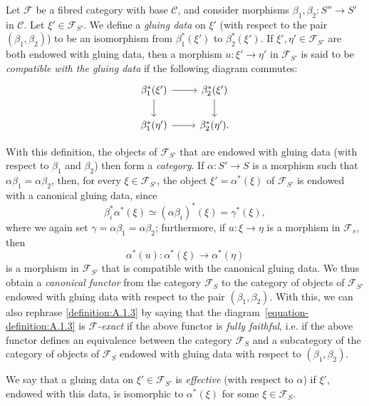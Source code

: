 \documentclass{article}
\theoremstyle{plain}
\theoremstyle{definition}
\newenvironment{definition}[1]
  {\renewcommand\theinnercustomdefinition{#1}\innercustomdefinition}
  {\endinnercustomdefinition}
\newcommand{\sh}[1]{{\mathscr{#1}}}
\newcommand{\cat}[1]{{\mathcal{#1}}}
\newcommand{\oldpage}[1]{\marginpar{\footnotesize$\Big\vert$ \textit{p.~#1}}}
\begin{document}
\begin{definition}{1.4}
  Let $\sh{F}$ be a fibred category with base $\cat{C}$, and consider morphisms $\beta_1,\beta_2\colon S''\to S'$ in $\cat{C}$.
  Let $\xi'\in\sh{F}_{S'}$.
  We define a \emph{gluing data} on $\xi'$ (with respect to the pair $(\beta_1,\beta_2)$) to be an isomorphism from $\beta_1^*(\xi')$ to $\beta_2^*(\xi')$.
  If $\xi',\eta'\in\sh{F}_{S'}$ are both endowed with gluing data, then a morphism $u\colon\xi'\to\eta'$ in $\sh{F}_{S'}$ is said to be \emph{compatible with the gluing data} if the following diagram commutes:
  \[
    \begin{tikzcd}
      \beta_1^*(\xi') \rar \dar
      &\beta_2^*(\xi') \dar
    \\\beta_1^*(\eta') \rar
      &\beta_2^*(\eta').
    \end{tikzcd}
  \]
\end{definition}

With this definition, the objects of $\sh{F}_{S'}$ that are endowed with gluing data (with respect to $\beta_1$ and $\beta_2$) then form a \emph{category}.
If $\alpha\colon S'\to S$ is a morphism such that $\alpha\beta_1=\alpha\beta_2$, then, for every $\xi\in\sh{F}_{S'}$, the object $\xi'=\alpha^*(\xi)$
\oldpage{190-04}
of $\sh{F}_{S'}$ is endowed with a canonical gluing data, since
\[
  \beta_i^*\alpha^*(\xi)
  \simeq (\alpha\beta_i)^*(\xi)
  = \gamma^*(\xi),
\]
where we again set $\gamma=\alpha\beta_1=\alpha\beta_2$;
furthermore, if $u\colon\xi\to\eta$ is a morphism in $\sh{F}_s$, then
\[
  \alpha^*(u)\colon \alpha^*(\xi) \to \alpha^*(\eta)
\]
is a morphism in $\sh{F}_{S'}$ that is compatible with the canonical gluing data.
We thus obtain a \emph{canonical functor} from the category $\sh{F}_S$ to the category of objects of $\sh{F}_{S'}$ endowed with gluing data with respect to the pair $(\beta_1,\beta_2)$.
With this, we can also rephrase \cref{definition:A.1.3} by saying that the diagram~\cref{equation-definition:A.1.3} is \emph{$\sh{F}$-exact} if the above functor is \emph{fully faithful}, i.e. if the above functor defines an equivalence between the category $\sh{F}_S$ and a subcategory of the category of objects of $\sh{F}_S$ endowed with gluing data with respect to $(\beta_1,\beta_2)$.

\begin{definition}{1.5}
\label{definition:A.1.5}
  We say that a gluing data on $\xi'\in\sh{F}_{S'}$ is \emph{effective} (with respect to $\alpha$) if $\xi'$, endowed with this data, is isomorphic to $\alpha^*(\xi)$ for some $\xi\in\sh{F}_S$.
\end{definition}
\end{document}
